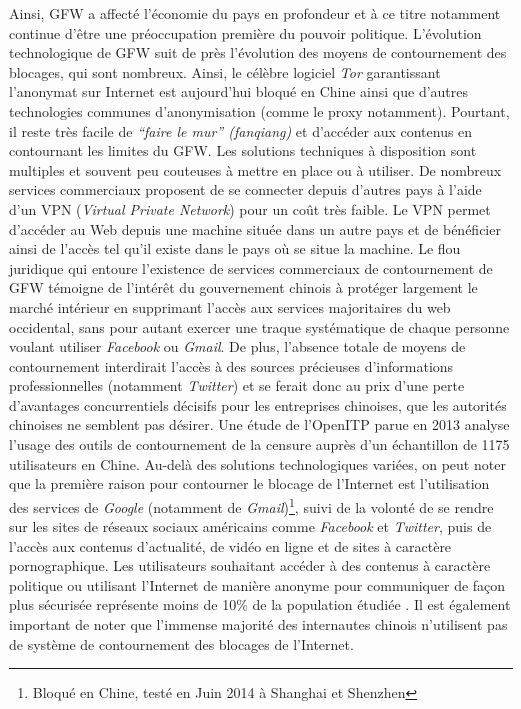 Ainsi, GFW a affecté l’économie du pays en profondeur et à ce titre notamment continue d’être une préoccupation première du pouvoir politique. L’évolution technologique de GFW suit de près l’évolution des moyens de contournement des blocages, qui sont nombreux. Ainsi, le célèbre logiciel \textit{Tor} garantissant l’anonymat sur Internet est aujourd’hui bloqué en Chine \citep{Winter2012} ainsi que d’autres technologies communes d’anonymisation (comme le proxy notamment). Pourtant, il reste très facile de \textit{“faire le mur” (fanqiang)} et d’accéder aux contenus en contournant les limites du GFW. Les solutions techniques à disposition sont multiples et souvent peu couteuses à mettre en place ou à utiliser. De nombreux services commerciaux proposent de se connecter depuis d’autres pays à l’aide d’un VPN (\textit{Virtual Private Network}) pour un coût très faible. Le VPN permet d'accéder au Web depuis une machine située dans un autre pays et de bénéficier ainsi de l’accès tel qu’il existe dans le pays où se situe la machine. Le flou juridique qui entoure l’existence de services commerciaux de contournement de GFW témoigne de l’intérêt du gouvernement chinois à protéger largement le marché intérieur en supprimant l’accès aux services majoritaires du web occidental, sans pour autant exercer une traque systématique de chaque personne voulant utiliser \textit{Facebook} ou \textit{Gmail}. De plus, l’absence totale de moyens de contournement interdirait l’accès à des sources précieuses d’informations professionnelles (notamment \textit{Twitter}) et se ferait donc au prix d’une perte d’avantages concurrentiels décisifs pour les entreprises chinoises, que les autorités chinoises ne semblent pas désirer. Une étude de l’OpenITP parue en 2013 analyse l’usage des outils de contournement de la censure auprès d’un échantillon de 1175 utilisateurs en Chine. Au-delà des solutions technologiques variées, on peut noter que la première raison pour contourner le blocage de l’Internet est l’utilisation des services de \textit{Google} (notamment de \textit{Gmail})\footnote{Bloqué en Chine, testé en Juin 2014 à Shanghai et Shenzhen}, suivi de la volonté de se rendre sur les sites de réseaux sociaux américains comme \textit{Facebook} et \textit{Twitter}, puis de l’accès aux contenus d’actualité, de vidéo en ligne et de sites à caractère pornographique. Les utilisateurs souhaitant accéder à des contenus à caractère politique ou utilisant l’Internet de manière anonyme pour communiquer de façon plus sécurisée représente moins de 10\% de la population étudiée \citep{OpenITP2013}. Il est également important de noter que l’immense majorité des internautes chinois n’utilisent pas de système de contournement des blocages de l’Internet. 


